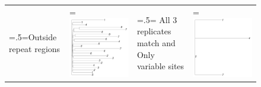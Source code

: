 \documentclass{article}
\begin{document}
\begin{figure}
\begin{tabularx}{\textwidth}{ >{\hsize=.5\hsize\linewidth=\hsize}X >{\hsize=1.5\hsize\linewidth=\hsize}X | >{\hsize=.5\hsize\linewidth=\hsize}X >{\hsize=1.5\hsize\linewidth=\hsize}X }
Outside repeat regions & \includegraphics[width=\linewidth]{06-repeat.pdf} &
All 3 replicates match and Only variable sites & \includegraphics[width=\linewidth]{07-replicate.pdf}\\

\end{tabularx}
\end{figure}
\end{document}
